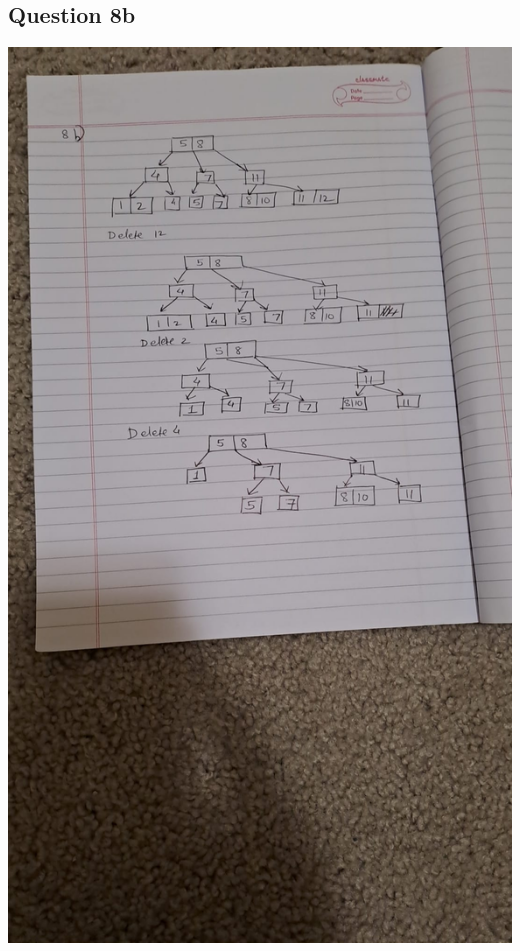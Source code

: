\documentclass{article}
\begin{document}
  \subsection*{Question 8b}
  \includegraphics[scale=0.2]{8b.jpeg}
\end{document}
